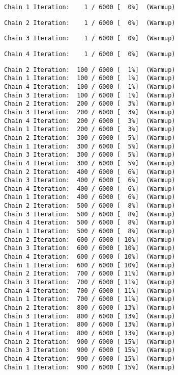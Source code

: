 \documentclass[
  letterpaper,
]{article}
\begin{document}
\begin{verbatim}
Chain 1 Iteration:    1 / 6000 [  0%]  (Warmup) 
\end{verbatim}

\begin{verbatim}
Chain 2 Iteration:    1 / 6000 [  0%]  (Warmup) 
\end{verbatim}

\begin{verbatim}
Chain 3 Iteration:    1 / 6000 [  0%]  (Warmup) 
\end{verbatim}

\begin{verbatim}
Chain 4 Iteration:    1 / 6000 [  0%]  (Warmup) 
\end{verbatim}

\begin{verbatim}
Chain 2 Iteration:  100 / 6000 [  1%]  (Warmup) 
Chain 1 Iteration:  100 / 6000 [  1%]  (Warmup) 
Chain 4 Iteration:  100 / 6000 [  1%]  (Warmup) 
Chain 3 Iteration:  100 / 6000 [  1%]  (Warmup) 
Chain 2 Iteration:  200 / 6000 [  3%]  (Warmup) 
Chain 3 Iteration:  200 / 6000 [  3%]  (Warmup) 
Chain 4 Iteration:  200 / 6000 [  3%]  (Warmup) 
Chain 1 Iteration:  200 / 6000 [  3%]  (Warmup) 
Chain 2 Iteration:  300 / 6000 [  5%]  (Warmup) 
Chain 1 Iteration:  300 / 6000 [  5%]  (Warmup) 
Chain 3 Iteration:  300 / 6000 [  5%]  (Warmup) 
Chain 4 Iteration:  300 / 6000 [  5%]  (Warmup) 
Chain 2 Iteration:  400 / 6000 [  6%]  (Warmup) 
Chain 3 Iteration:  400 / 6000 [  6%]  (Warmup) 
Chain 4 Iteration:  400 / 6000 [  6%]  (Warmup) 
Chain 1 Iteration:  400 / 6000 [  6%]  (Warmup) 
Chain 2 Iteration:  500 / 6000 [  8%]  (Warmup) 
Chain 3 Iteration:  500 / 6000 [  8%]  (Warmup) 
Chain 4 Iteration:  500 / 6000 [  8%]  (Warmup) 
Chain 1 Iteration:  500 / 6000 [  8%]  (Warmup) 
Chain 2 Iteration:  600 / 6000 [ 10%]  (Warmup) 
Chain 3 Iteration:  600 / 6000 [ 10%]  (Warmup) 
Chain 4 Iteration:  600 / 6000 [ 10%]  (Warmup) 
Chain 1 Iteration:  600 / 6000 [ 10%]  (Warmup) 
Chain 2 Iteration:  700 / 6000 [ 11%]  (Warmup) 
Chain 3 Iteration:  700 / 6000 [ 11%]  (Warmup) 
Chain 4 Iteration:  700 / 6000 [ 11%]  (Warmup) 
Chain 1 Iteration:  700 / 6000 [ 11%]  (Warmup) 
Chain 2 Iteration:  800 / 6000 [ 13%]  (Warmup) 
Chain 3 Iteration:  800 / 6000 [ 13%]  (Warmup) 
Chain 1 Iteration:  800 / 6000 [ 13%]  (Warmup) 
Chain 4 Iteration:  800 / 6000 [ 13%]  (Warmup) 
Chain 2 Iteration:  900 / 6000 [ 15%]  (Warmup) 
Chain 3 Iteration:  900 / 6000 [ 15%]  (Warmup) 
Chain 4 Iteration:  900 / 6000 [ 15%]  (Warmup) 
Chain 1 Iteration:  900 / 6000 [ 15%]  (Warmup) 

\end{verbatim}
\end{document}
